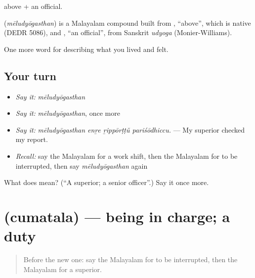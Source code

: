  above +  an official.

\begin{cousinweb}
\textbf{} (\emph{mēludyōgasthan}) is a Malayalam compound built from , \textquotedblleft{}above\textquotedblright{}, which is native (DEDR 5086), and , \textquotedblleft{}an official\textquotedblright{}, from Sanskrit \emph{udyoga} (Monier-Williams).
\end{cousinweb}

\begin{grammarlens}[title={What you've built}]
One more word for describing what you lived and felt.
\end{grammarlens}

\subsection*{Your turn}
\begin{itemize}
\raggedright
  \item \emph{Say it:} \emph{mēludyōgasthan}
  \item \emph{Say it:} \emph{mēludyōgasthan}, once more
  \item \emph{Say it:} \emph{mēludyōgasthan enṟe ṟippōrṭṭŭ pariśōdhiccu.} — My superior checked my report.
  \item \emph{Recall:} say the Malayalam for a work shift, then the Malayalam for to be interrupted, then say \emph{mēludyōgasthan} again
\end{itemize}

\begin{tcolorbox}[breakable,colback=teal!4,colframe=teal!35!black,title={Before you move on}]
What does  mean? (\textquotedblleft{}A superior; a senior officer\textquotedblright{}.) Say it once more.
\end{tcolorbox}
\section[\texorpdfstring{\ml{ചുമതല} (cumatala)}{ചുമതല (cumatala)}]{ (cumatala) — being in charge; a duty}

\label{lesson:ML-C545-cumatala}



\begin{quote}
Before the new one: say the Malayalam for to be interrupted, then the Malayalam for a superior.
\end{quote}

